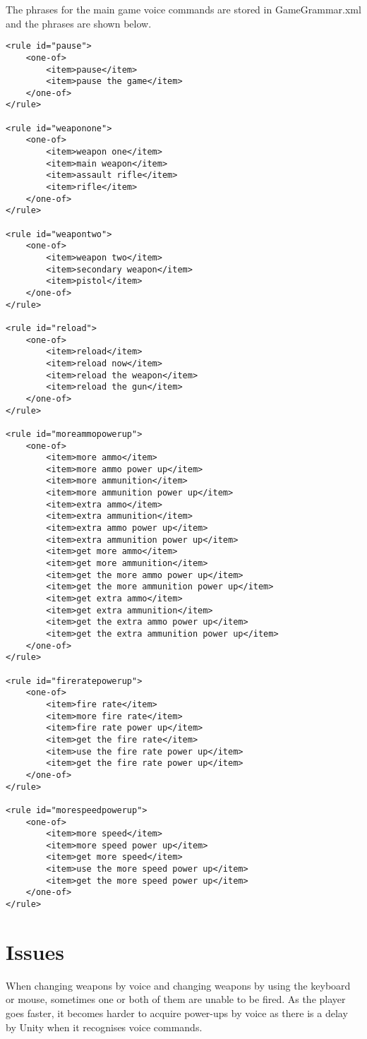 \documentclass{article}
\begin{document}
The phrases for the main game voice commands are stored in GameGrammar.xml and the phrases are shown below.
\begin{verbatim}
<rule id="pause">
    <one-of>
        <item>pause</item>
        <item>pause the game</item>
    </one-of>
</rule>

<rule id="weaponone">
    <one-of>
        <item>weapon one</item>
        <item>main weapon</item>
        <item>assault rifle</item>
        <item>rifle</item>
    </one-of>
</rule>

<rule id="weapontwo">
    <one-of>
        <item>weapon two</item>
        <item>secondary weapon</item>
        <item>pistol</item>
    </one-of>
</rule>

<rule id="reload">
    <one-of>
        <item>reload</item>
        <item>reload now</item>
        <item>reload the weapon</item>
        <item>reload the gun</item>
    </one-of>
</rule>

<rule id="moreammopowerup">
    <one-of>
        <item>more ammo</item>
        <item>more ammo power up</item>
        <item>more ammunition</item>
        <item>more ammunition power up</item>
        <item>extra ammo</item>
        <item>extra ammunition</item>
        <item>extra ammo power up</item>
        <item>extra ammunition power up</item>
        <item>get more ammo</item>
        <item>get more ammunition</item>
        <item>get the more ammo power up</item>
        <item>get the more ammunition power up</item>
        <item>get extra ammo</item>
        <item>get extra ammunition</item>
        <item>get the extra ammo power up</item>
        <item>get the extra ammunition power up</item>
    </one-of>
</rule>

<rule id="fireratepowerup">
    <one-of>
        <item>fire rate</item>
        <item>more fire rate</item>
        <item>fire rate power up</item>
        <item>get the fire rate</item>
        <item>use the fire rate power up</item>
        <item>get the fire rate power up</item>
    </one-of>
</rule>

<rule id="morespeedpowerup">
    <one-of>
        <item>more speed</item>
        <item>more speed power up</item>
        <item>get more speed</item>
        <item>use the more speed power up</item>
        <item>get the more speed power up</item>
    </one-of>
</rule>
\end{verbatim}

\section{Issues}
When changing weapons by voice and changing weapons by using the keyboard or mouse, sometimes one or both of them are unable to be fired. As the player goes faster, it becomes harder to acquire power-ups by voice as there is a delay by Unity when it recognises voice commands.
\end{document}
